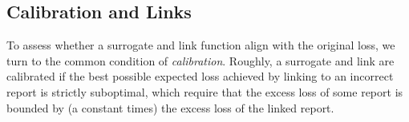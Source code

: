\documentclass[11pt]{article}
\newcommand{\Comments}{1}
\newcommand{\mynote}[2]{\ifnum\Comments=1\textcolor{#1}{#2}\fi}
\newcommand{\raf}[1]{\mynote{darkgreen}{[RF: #1]}}
\newcommand{\reals}{\mathbb{R}}
\newcommand{\simplex}{\Delta_\Y}
\newcommand{\R}{\mathcal{R}}
\newcommand{\X}{\mathcal{X}}
\newcommand{\Y}{\mathcal{Y}}
\newcommand{\inprod}[2]{\langle #1, #2 \rangle}%
\newtheorem{definition}{Definition}
\begin{document}
\subsection{Calibration and Links}
\label{sec:calibration}


To assess whether a surrogate and link function align with the original loss, we turn to the common condition of \emph{calibration}.
Roughly, a surrogate and link are calibrated if the best possible expected loss achieved by linking to an incorrect report is strictly suboptimal, which require that the excess loss of some report is bounded by (a constant times) the excess loss of the linked report.


\end{document}
